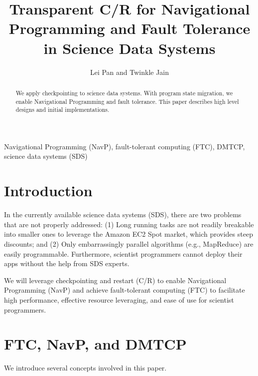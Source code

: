 \documentclass[conference]{IEEEtran}
\begin{document}
\title{Transparent C/R for Navigational Programming and Fault Tolerance in Science Data Systems}

\author{Lei Pan and Twinkle Jain}

\maketitle

\begin{abstract}
We apply checkpointing to science data systems. With program state migration, we enable Navigational Programming and fault tolerance. This paper describes high level designs and initial implementations.
\end{abstract}

\begin{IEEEkeywords}
Navigational Programming (NavP), fault-tolerant computing (FTC), DMTCP, science data systems (SDS)
\end{IEEEkeywords}
\vspace{-2.2mm}
\section{Introduction}
\label{sec:introduction}
In the currently available science data systems (SDS), there are two problems that are not properly addressed: (1) Long running tasks are not readily breakable into smaller ones to leverage the Amazon EC2 Spot market, which provides steep discounts; and (2) Only embarrassingly parallel algorithms (e.g., MapReduce) are easily programmable. Furthermore, scientist programmers cannot deploy their apps without the help from SDS experts.

We will leverage checkpointing and restart (C/R) to enable Navigational Programming (NavP) and achieve fault-tolerant computing (FTC) to facilitate high performance, effective resource leveraging, and ease of use for scientist programmers.

\section{FTC, NavP, and DMTCP}
\label{sec:s1}
We introduce several concepts involved in this paper.
\cite{ansel2009dmtcp}
\end{document}
